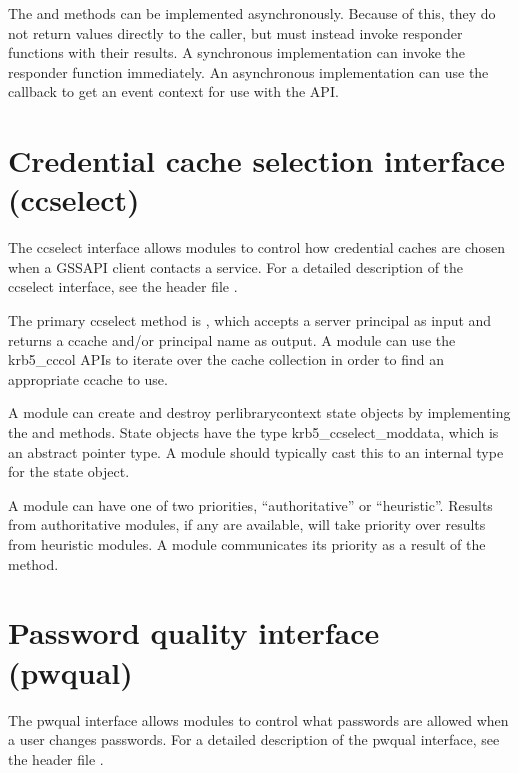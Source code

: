 \documentclass[letterpaper,10pt,english]{sphinxmanual}
\begin{document}
\sphinxAtStartPar
The  and  methods can be implemented
asynchronously.  Because of this, they do not return values directly
to the caller, but must instead invoke responder functions with their
results.  A synchronous implementation can invoke the responder
function immediately.  An asynchronous implementation can use the
callback to get an event context for use with the  API.


\section{Credential cache selection interface (ccselect)}
\label{\detokenize{plugindev/ccselect:credential-cache-selection-interface-ccselect}}\label{\detokenize{plugindev/ccselect:ccselect-plugin}}\label{\detokenize{plugindev/ccselect::doc}}
\sphinxAtStartPar
The ccselect interface allows modules to control how credential caches
are chosen when a GSSAPI client contacts a service.  For a detailed
description of the ccselect interface, see the header file
.

\sphinxAtStartPar
The primary ccselect method is , which accepts a server
principal as input and returns a ccache and/or principal name as
output.  A module can use the krb5\_cccol APIs to iterate over the
cache collection in order to find an appropriate ccache to use.

\sphinxAtStartPar
A module can create and destroy per\sphinxhyphen{}library\sphinxhyphen{}context state objects by
implementing the  and  methods.  State objects have
the type krb5\_ccselect\_moddata, which is an abstract pointer type.  A
module should typically cast this to an internal type for the state
object.

\sphinxAtStartPar
A module can have one of two priorities, “authoritative” or
“heuristic”.  Results from authoritative modules, if any are
available, will take priority over results from heuristic modules.  A
module communicates its priority as a result of the  method.


\section{Password quality interface (pwqual)}
\label{\detokenize{plugindev/pwqual:password-quality-interface-pwqual}}\label{\detokenize{plugindev/pwqual:pwqual-plugin}}\label{\detokenize{plugindev/pwqual::doc}}
\sphinxAtStartPar
The pwqual interface allows modules to control what passwords are
allowed when a user changes passwords.  For a detailed description of
the pwqual interface, see the header file .
\end{document}
